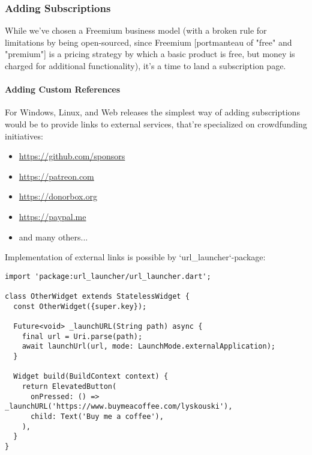 
\subsubsection{Adding Subscriptions}

While we've chosen a Freemium business model (with a broken rule for limitations by being open-sourced, since Freemium 
[portmanteau of "free" and "premium"] is a pricing strategy by which a basic product is free, but money is charged for 
additional functionality), it's a time to land a subscription page.


\paragraph{Adding Custom References}

For Windows, Linux, and Web releases the simplest way of adding subscriptions would be to provide links to external 
services, that're specialized on crowdfunding initiatives:

\begin{itemize}
  \item  \href{https://github.com/sponsors}{https://github.com/sponsors}
  \item  \href{https://patreon.com}{https://patreon.com}
  \item  \href{https://donorbox.org}{https://donorbox.org}
  \item  \href{https://paypal.me}{https://paypal.me}
  \item  and many others...
\end{itemize}

\noindent Implementation of external links is possible by `url\_launcher`-package:

\begin{lstlisting}
import 'package:url_launcher/url_launcher.dart';

class OtherWidget extends StatelessWidget {
  const OtherWidget({super.key});

  Future<void> _launchURL(String path) async {
    final url = Uri.parse(path);
    await launchUrl(url, mode: LaunchMode.externalApplication);
  }

  Widget build(BuildContext context) {
    return ElevatedButton(
      onPressed: () => _launchURL('https://www.buymeacoffee.com/lyskouski'),
      child: Text('Buy me a coffee'),
    ),
  }
}
\end{lstlisting}


